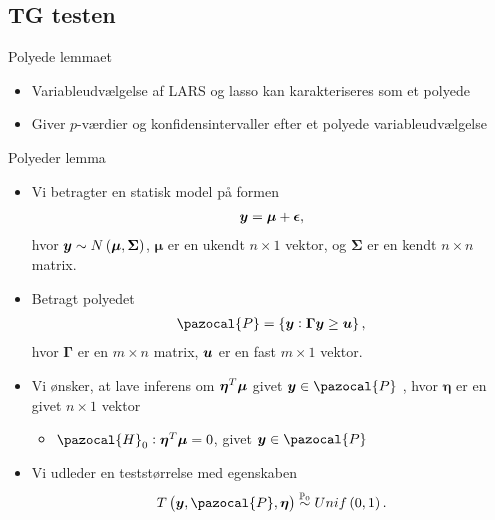 \subsection{TG testen}
\begin{frame}{Polyede lemmaet}
\begin{itemize}
\item Variableudvælgelse af LARS og lasso kan karakteriseres som et polyede
\item Giver $p$-værdier og konfidensintervaller efter et polyede variableudvælgelse
\end{itemize}
\end{frame}

\begin{frame}{Polyeder lemma}
\begin{itemize}
\item Vi betragter en statisk model på formen
\begin{align*}
\vy = \vmu + \veps, 
\end{align*}
hvor $\vy \sim N\del{\boldsymbol\mu, \boldsymbol\Sigma}$, $\boldsymbol \mu$ er en ukendt $n \times 1$ vektor, og $\boldsymbol\Sigma$ er en kendt $n \times n$ matrix. 
\item Betragt polyedet
\begin{align*}
\pazocal{P} = \cbr{\vy: \boldsymbol \Gamma \vy \geq \vu},
\end{align*} 
hvor $\boldsymbol \Gamma $ er en $m \times n$ matrix, $\bm{u}$ er en fast $m \times 1$ vektor.
\item Vi ønsker, at lave inferens om $\boldsymbol \eta^T \bm{\mu}$ givet $\vy \in \pazocal{P}$ , hvor $\boldsymbol \eta$ er en givet $n \times 1$ vektor
\begin{itemize}
\item $\pazocal{H}_0: \boldsymbol \eta^T \boldsymbol \mu = 0$, givet $\vy \in \pazocal{P}$
\end{itemize} 
\item Vi udleder en teststørrelse med egenskaben
\begin{align*}
T\del{ \vy, \pazocal{P}, \boldsymbol \eta} \overset{\mathbb{P}_0}{\sim} Unif \del{0,1}.
\end{align*}
\end{itemize}
\end{frame}

